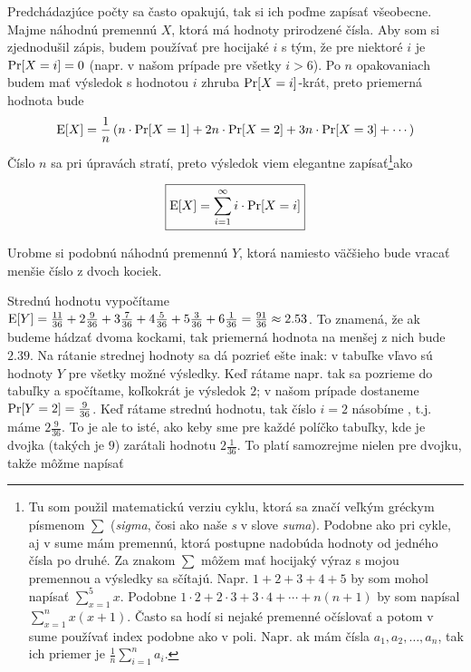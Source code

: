 {Predchádazjúce počty sa často opakujú, tak si ich poďme zapísať všeobecne. Majme náhodnú premennú
$X$, ktorá má hodnoty prirodzené čísla. Aby som si zjednodušil zápis, budem používať
 pre hocijaké $i$ s tým, že pre niektoré $i$  je $\text{Pr}[X=i]=0$ (napr. v našom prípade pre všetky
$i>6$). 
Po $n$ opakovaniach budem mať výsledok s hodnotou $i$ zhruba $\text{Pr}[X=i]$-krát, preto  priemerná hodnota
bude
$$\text{E}[X]=\frac{1}{n}\left(n\cdot\text{Pr}[X=1]+2n\cdot\text{Pr}[X=2]+3n\cdot\text{Pr}[X=3]+\cdots\right)$$
Číslo $n$ sa pri úpravách stratí, preto výsledok viem elegantne zapísať\footnote{
  Tu som použil matematickú verziu  cyklu, ktorá sa značí veľkým gréckym písmenom $\sum$
  ({\em sigma}, čosi ako naše {\em s} v slove {\em suma}). Podobne ako pri  cykle, aj v sume
  mám premennú, ktorá postupne nadobúda hodnoty od jedného čísla po druhé. Za znakom $\sum$ môžem
  mať hocijaký výraz s mojou premennou a výsledky sa sčítajú. Napr. $1+2+3+4+5$ by som 
  mohol napísať $\sum\limits_{x=1}^5x$. Podobne $1\cdot2+2\cdot3+3\cdot4+\cdots+n(n+1)$ by som 
  napísal $\sum\limits_{x=1}^nx(x+1)$. Často sa hodí si nejaké premenné očíslovať a potom v sume
  používať index podobne ako v poli. Napr. ak mám čísla $a_1,a_2,\ldots,a_n$, tak ich 
  priemer je $\frac{1}{n}\sum\limits_{i=1}^na_i$. 
}ako 

\begin{equation*}\boxed{\text{E}[X]=\sum_{i=1}^\infty i\cdot\text{Pr}[X=i]}\end{equation*}


Urobme si podobnú náhodnú premennú $Y$, ktorá namiesto väčšieho bude vracať menšie číslo z dvoch
kociek.

\def\fnY#1#2{%
  \ifnum\i<\j\def\res{\i}\else\def\res{\j}\fi
 \def\clr{\ifcase\res\relax\or yellow\or orange\or red\or magenta\or blue\else green\fi}
}




Strednú hodnotu vypočítame 
$\text{E}[Y]=\frac{11}{36}+2\frac{9}{36}+3\frac{7}{36}+4\frac{5}{36}+5\frac{3}{36}+6\frac{1}{36}=
\frac{91}{36}\approx2.53$. To znamená, že ak budeme hádzať dvoma kockami, tak priemerná
hodnota na menšej z nich bude $2.39$. Na rátanie strednej hodnoty sa dá pozrieť 
ešte inak: v tabuľke vľavo sú hodnoty $Y$ pre všetky možné výsledky. Keď rátame 
napr.  tak sa pozrieme do tabuľky a spočítame, koľkokrát je výsledok $2$;
v našom prípade dostaneme $\text{Pr}[Y=2]=\frac{9}{36}$. Keď rátame strednú hodnotu, tak
číslo $i=2$ násobíme , t.j. máme $2\frac{9}{36}$. To je ale to isté, ako keby sme pre
každé políčko tabuľky, kde je dvojka (takých je $9$) zarátali hodnotu $2\frac{1}{36}$. To 
platí samozrejme nielen pre dvojku, takže môžme napísať

}
